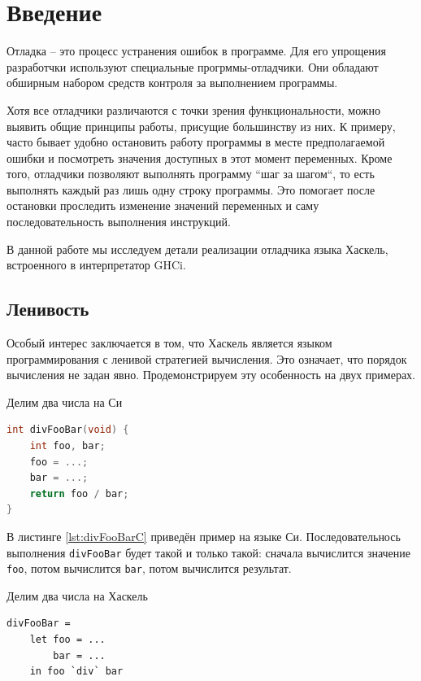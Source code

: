 \documentclass[fontsize=14pt, paper=a4, pagesize, DIV=calc]{scrartcl}
\def\code#1{\texttt{#1}}
\begin{document}
\tableofcontents
\newpage

\section{Введение}

Отладка -- это процесс устранения ошибок в программе. Для его упрощения
разработчки используют специальные прогрммы-отладчики. Они обладают обширным
набором средств контроля за выполнением программы. 

Хотя все отладчики различаются с точки зрения функциональности, можно выявить
общие принципы работы, присущие большинству из них. К примеру, часто бывает
удобно остановить работу программы в месте предполагаемой ошибки и посмотреть
значения доступных в этот момент переменных. Кроме того, отладчики позволяют
выполнять программу ``шаг за шагом``, то есть выполнять каждый раз лишь одну
строку программы. Это помогает после остановки проследить изменение значений
переменных и саму последовательность выполнения инструкций.

В данной работе мы исследуем детали реализации отладчика языка Хаскель,
встроенного в интерпретатор GHCi. 

\subsection{Ленивость}

Особый интерес заключается в том, что Хаскель является языком программирования
с ленивой стратегией вычисления. Это означает, что порядок вычисления не задан
явно. Продемонстрируем эту особенность на двух примерах.

\begin{ListingEnv}
\caption{Делим два числа на Си}
\label{lst:divFooBarC}
\begin{lstlisting}[language=c]
int divFooBar(void) {
    int foo, bar;
    foo = ...;
    bar = ...;
    return foo / bar;
}
\end{lstlisting}
\end{ListingEnv}

В листинге \ref{lst:divFooBarC} приведён пример на языке Си. Последовательнось
выполнения \code{divFooBar} будет такой и только такой: сначала вычислится
значение \code{foo}, потом вычислится \code{bar}, потом вычислится результат.

\begin{ListingEnv}
\caption{Делим два числа на Хаскель}
\label{lst:divFooBarHaskell}
\begin{lstlisting}
divFooBar =
    let foo = ...
        bar = ...
    in foo `div` bar
\end{lstlisting}
\end{ListingEnv}
\end{document}
